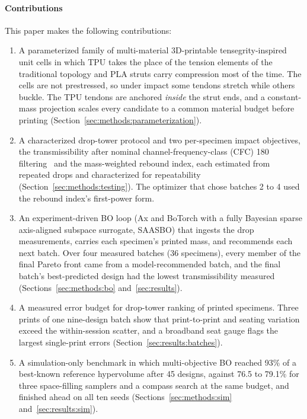 \documentclass[lineno,nocopyright,upint,varvw,hyphenate]{asmejour}
\begin{document}
\paragraph*{Contributions} This paper makes the following contributions:
\begin{enumerate}
  \item A parameterized family of multi-material 3D-printable
    tensegrity-inspired unit cells in which TPU takes the place of the
    tension elements of the traditional topology and PLA struts carry
    compression most of the time. The cells are not prestressed, so
    under impact some tendons stretch while others buckle. The TPU
    tendons are anchored \emph{inside} the strut ends, and a
    constant-mass projection scales every candidate to a common
    material budget before printing
    (Section~\ref{sec:methods:parameterization}).
  \item A characterized drop-tower protocol and two per-specimen impact
    objectives, the transmissibility after nominal channel-frequency-class
    (CFC) 180 filtering~\citep{saej211} and the mass-weighted rebound
    index, each estimated from repeated drops and characterized for
    repeatability (Section~\ref{sec:methods:testing}). The optimizer that
    chose batches 2 to 4 used the rebound index's first-power form.
  \item An experiment-driven BO loop (Ax and BoTorch with a fully
    Bayesian sparse axis-aligned subspace surrogate, SAASBO) that ingests
    the drop measurements, carries each specimen's printed mass, and
    recommends each next batch. Over four measured batches
    (36 specimens), every member of the final Pareto front came from a
    model-recommended batch, and the final batch's best-predicted design
    had the lowest transmissibility measured
    (Sections~\ref{sec:methods:bo} and~\ref{sec:results}).
  \item A measured error budget for drop-tower ranking of printed
    specimens. Three prints of one nine-design batch show that
    print-to-print and seating variation exceed the within-session
    scatter, and a broadband seat gauge flags the largest single-print
    errors (Section~\ref{sec:results:batches}).
  \item A simulation-only benchmark in which multi-objective BO reached
    93\% of a best-known reference hypervolume after 45 designs, against
    76.5 to 79.1\% for three space-filling samplers and a compass search at the same budget,
    and finished ahead on all ten seeds (Sections~\ref{sec:methods:sim}
    and~\ref{sec:results:sim}).
\end{enumerate}
\end{document}
